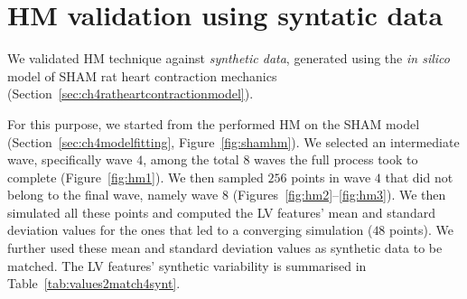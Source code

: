 %
%
%
\section{HM validation using syntatic data}\label{chA:HM_validation_using_syntatic_data}
We validated HM technique against \textit{synthetic data}, generated using the \textit{in silico} model of SHAM rat heart contraction mechanics (Section~\ref{sec:ch4ratheartcontractionmodel}).

\vspace{0.2cm}
For this purpose, we started from the performed HM on the SHAM model (Section~\ref{sec:ch4modelfitting}, Figure~\ref{fig:shamhm}). We selected an intermediate wave, specifically wave $4$, among the total $8$ waves the full process took to complete (Figure~\ref{fig:hm1}). We then sampled $256$ points in wave $4$ that did not belong to the final wave, namely wave $8$ (Figures~\ref{fig:hm2}--\ref{fig:hm3}). We then simulated all these points and computed the LV features' mean and standard deviation values for the ones that led to a converging simulation ($48$ points). We further used these mean and standard deviation values as synthetic data to be matched. The LV features' synthetic variability is summarised in Table~\ref{tab:values2match4synt}.

